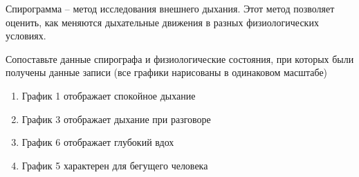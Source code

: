 
Спирограмма – метод исследования внешнего дыхания. Этот
метод позволяет оценить, как меняются дыхательные движения в разных
физиологических условиях.


Сопоставьте данные спирографа и физиологические состояния,
при которых были получены данные записи (все графики нарисованы в одинаковом
масштабе)

\begin{enumerate}
    \item График 1 отображает спокойное дыхание
    \item График 3 отображает дыхание при разговоре
    \item График 6 отображает глубокий вдох
    \item График 5 характерен для бегущего человека
\end{enumerate}



